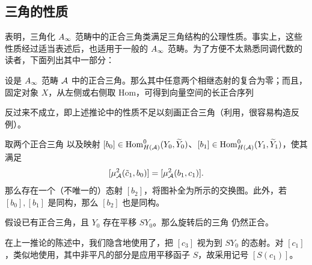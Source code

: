 \clearpage
\subsection{三角的性质}\label{sec:3i}
表明，三角化 $A_\infty$ 范畴中的正合三角类满足三角结构的公理性质。事实上，这些性质经过适当表述后，也适用于一般的 $A_\infty$ 范畴。为了方便不太熟悉同调代数的读者，下面列出其中一部分：
\begin{corollary}\label{st:3.15}
设是 $A_\infty$ 范畴 $\mathcal A$ 中的正合三角。那么其中任意两个相继态射的复合为零；而且，固定对象 $X$，从左侧或右侧取 Hom，可得到向量空间的长正合序列
\end{corollary}
反过来不成立，即上述推论中的性质不足以刻画正合三角（利用，很容易构造反例）。
\begin{corollary}\label{st:3.16}
取两个正合三角
以及映射 $[b_0]\in\operatorname{Hom}^0_{H(\mathcal A)}(Y_0,\widetilde Y_0)$、$[b_1]\in\operatorname{Hom}^0_{H(\mathcal A)}(Y_1,\widetilde Y_1)$，使其满足
\[
[\mu^2_{\mathcal A}(\tilde c_1,b_0)]=[\mu^2_{\mathcal A}(b_1,c_1)].
\]
那么存在一个（不唯一的）态射 $[b_2]$，将图补全为所示的交换图。此外，若 $[b_0],[b_1]$ 是同构，那么 $[b_2]$ 也是同构。
\end{corollary}

\begin{corollary}\label{st:3.17}
假设已有正合三角，且 $Y_0$ 存在平移 $SY_0$。那么旋转后的三角
仍然正合。
\end{corollary}
在上一推论的陈述中，我们隐含地使用了，把 $[c_3]$ 视为到 $SY_0$ 的态射。对 $[c_1]$，类似地使用，其中非平凡的部分是应用平移函子 $S$，故采用记号 $[S(c_1)]$。

